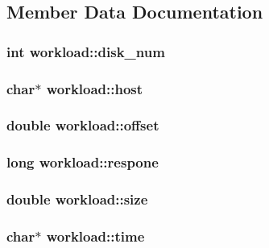 \subsection{Member Data Documentation}
\hypertarget{structworkload_ac5fbfd8a1e652dc2b6e742ce685eb1fa}{
\subsubsection[{disk\+\_\+num}]{\setlength{\rightskip}{0pt plus 5cm}int workload\+::disk\+\_\+num}}\label{structworkload_ac5fbfd8a1e652dc2b6e742ce685eb1fa}
\hypertarget{structworkload_a3d757b51dfb82980f5a979a97bf0dfa1}{
\subsubsection[{host}]{\setlength{\rightskip}{0pt plus 5cm}char$\ast$ workload\+::host}}\label{structworkload_a3d757b51dfb82980f5a979a97bf0dfa1}
\hypertarget{structworkload_a05766e7402dae7d93f0f6602e4498a36}{
\subsubsection[{offset}]{\setlength{\rightskip}{0pt plus 5cm}double workload\+::offset}}\label{structworkload_a05766e7402dae7d93f0f6602e4498a36}
\hypertarget{structworkload_a8de001cbb458db8f4502435a2a6c2030}{
\subsubsection[{respone}]{\setlength{\rightskip}{0pt plus 5cm}long workload\+::respone}}\label{structworkload_a8de001cbb458db8f4502435a2a6c2030}
\hypertarget{structworkload_a5a1b5a6bbc572a36211bb56219e41d2e}{
\subsubsection[{size}]{\setlength{\rightskip}{0pt plus 5cm}double workload\+::size}}\label{structworkload_a5a1b5a6bbc572a36211bb56219e41d2e}
\hypertarget{structworkload_a4401c89ba5cdd383f04301470e163cfd}{
\subsubsection[{time}]{\setlength{\rightskip}{0pt plus 5cm}char$\ast$ workload\+::time}}\label{structworkload_a4401c89ba5cdd383f04301470e163cfd}
